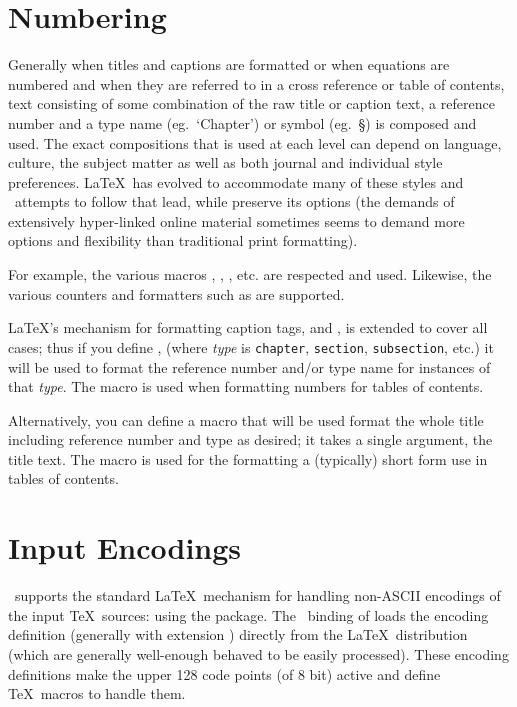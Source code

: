 \documentclass{book}
\begin{document}
\section{Numbering}\label{localization.numbering}
Generally when titles and captions are formatted or when equations are numbered
and when they are referred to in a cross reference or table of contents,
text consisting of some combination of the raw title or caption text,
a reference number and a type name (eg.~`Chapter') or symbol (eg.~\S) is composed and used.
The exact compositions that is used at each level can depend on language, culture,
the subject matter as well as both journal and individual style preferences.
\LaTeX\ has evolved to accommodate many of these styles and
\LaTeXML\ attempts to follow that lead, while preserve its options
(the demands of extensively hyper-linked  online material sometimes seems
to demand more options and flexibility than traditional print formatting).

For example, the various macros , , , etc.
are respected and used.  Likewise, the various counters and formatters such
as  are supported.

\LaTeX's mechanism for formatting caption tags,  and , is extended
to cover all cases; thus if you define ,
 (where \textit{type} is \texttt{chapter}, \texttt{section}, \texttt{subsection}, etc.)
it will be used to format the reference number and/or type name for instances of that \textit{type}.
The macro  is used when formatting numbers for tables of contents.

Alternatively, you can define a macro   that will be used format the whole
title including reference number and type as desired; it takes a single argument, the title text.
The macro  is used for the formatting a (typically) short form use in tables of contents.


\section{Input Encodings}\label{localization.inputencodings}
\LaTeXML\ supports the standard \LaTeX\ mechanism for handling
non-ASCII encodings of the input \TeX\ sources: using the  package.
The \LaTeXML\ binding of  loads the encoding definition (generally with extension )
directly from the \LaTeX\ distribution (which are generally well-enough behaved to be
easily processed).  These encoding definitions make the upper 128 code points (of 8 bit)
active and define \TeX\ macros to handle them.
\end{document}
